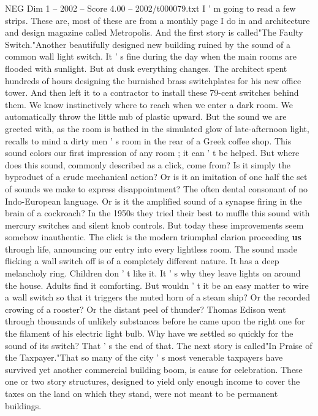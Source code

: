 \begin{textsample}{NEG Dim 1 – 2002 – Score 4.00 – 2002/t000079.txt}  \label{ex:f1_neg_064}
I ' m going to read a few strips.
These are, most of these are from a monthly page I do in and architecture and design magazine called Metropolis.
And the first story is called"The Faulty Switch."Another beautifully designed new building ruined by the sound of a common wall light switch.
It ' s fine during the day when the main rooms are flooded with sunlight.
But at dusk everything changes.
The architect spent hundreds of hours designing the burnished brass switchplates for his new office tower.
And then left it to a contractor to install these 79-cent switches behind them.
We know instinctively where to reach when we enter a dark room.
We automatically throw the little nub of plastic upward.
But the sound we are greeted with, as the room is bathed in the simulated glow of late-afternoon light, recalls to mind a dirty men ' s room in the rear of a Greek coffee shop.
This sound colors our first impression of any room ; it can ' t be helped.
But where does this sound, commonly described as a click, come from?
Is it simply the byproduct of a crude mechanical action?
Or is it an imitation of one half the set of sounds we make to express disappointment?
The often dental consonant of no Indo-European language.
Or is it the amplified sound of a synapse firing in the brain of a cockroach?
In the 1950s they tried their best to muffle this sound with mercury switches and silent knob controls.
But today these improvements seem somehow inauthentic.
The click is the modern triumphal clarion proceeding \textbf{us} through life, announcing our entry into every lightless room.
The sound made flicking a wall switch off is of a completely different nature.
It has a deep melancholy ring.
Children don ' t like it.
It ' s why they leave lights on around the house.
Adults find it comforting.
But wouldn ' t it be an easy matter to wire a wall switch so that it triggers the muted horn of a steam ship?
Or the recorded crowing of a rooster?
Or the distant peel of thunder?
Thomas Edison went through thousands of unlikely substances before he came upon the right one for the filament of his electric light bulb.
Why have we settled so quickly for the sound of its switch?
That ' s the end of that.
The next story is called"In Praise of the Taxpayer."That so many of the city ' s most venerable taxpayers have survived yet another commercial building boom, is cause for celebration.
These one or two story structures, designed to yield only enough income to cover the taxes on the land on which they stand, were not meant to be permanent buildings.

\end{textsample}

